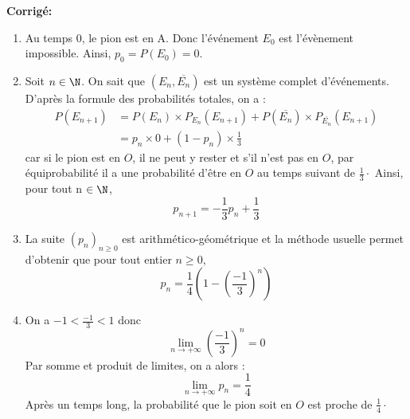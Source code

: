 \documentclass[a4paper,twoside,french,10pt]{VcCours}
\newcommand{\corr}{\textbf{Corrigé:}}
\begin{document}
\corr \begin{enumerate}
\item Au temps 0, le pion est en A. Donc l'événement $E_0$ est l'évènement impossible. Ainsi, $p_0=P(E_0)=0$.

\item Soit $n\in \N$. On sait que $(E_n, \overline{E_n})$ est un système complet d'événements. D'après la formule des probabilités totales, on a :
\begin{align*}
 P(E_{n+1}) &= P(E_n) \times P_{E_n}(E_{n+1}) + P(\overline{E_n}) \times P_{\overline{E_n}}(E_{n+1})\\
 &= p_n \times 0 + (1-p_n) \times \frac 13
\end{align*}
car si le pion est en $O$, il ne peut y rester et s'il n'est pas en $O$, par équiprobabilité il a une probabilité d'être en $O$ au temps suivant de $\frac 13 \cdot$ Ainsi, pour tout n $\in \N$, 
$$p_{n+1} = -\frac 13 p_n + \frac 13$$

\item La suite $(p_n)_{n \geq 0}$ est arithmético-géométrique et la méthode usuelle permet d'obtenir que pour tout entier $n \geq 0$,
$$ p_n = \frac 14 \left( 1 - \left(\frac{-1}{3}\right)^n\right) $$
\item On a $-1 < \frac{-1}{3}<1$ donc 
$$\lim_{n\to +\infty} \left(\frac{-1}{3}\right)^n = 0$$
Par somme et produit de limites, on a alors :
\[ \lim_{n\to +\infty} p_n = \frac 14 \]
Après un temps long, la probabilité que le pion soit en $O$ est proche de $ \frac 14 \cdot$
\end{enumerate}
\end{document}
